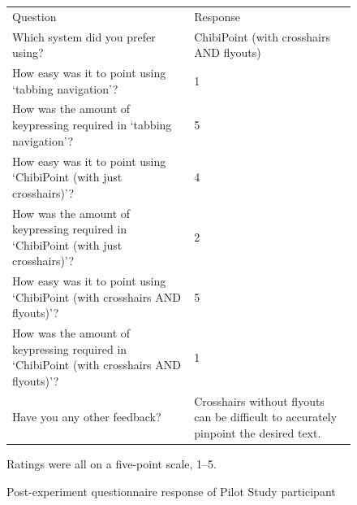 \documentclass[a4paper, 12pt]{report}
\begin{document}
\begin{figure}[ht]
\begin{tabular}{l l}
\hline\hline %
Question & Response \\ [0.5ex] %
Which system did you prefer using?	&	ChibiPoint (with crosshairs AND flyouts)	\\
How easy was it to point using `tabbing navigation'?	&	1	\\
How was the amount of keypressing required in `tabbing navigation'?	&	5	\\
How easy was it to point using `ChibiPoint (with just crosshairs)'?	&	4	\\
How was the amount of keypressing required in `ChibiPoint (with just crosshairs)'?	&	2	\\
How easy was it to point using `ChibiPoint (with crosshairs AND flyouts)'?	&	5	\\
How was the amount of keypressing required in `ChibiPoint (with crosshairs AND flyouts)'?	&	1	\\
Have you any other feedback?	&	Crosshairs without flyouts can be difficult to accurately pinpoint the desired text.	\\
\hline %
\end{tabular}
\caption{Post-experiment questionnaire response of Pilot Study participant}
Ratings were all on a five-point scale, 1--5.
\label{fig:partic_pilotpost}
\end{figure}
\end{document}
